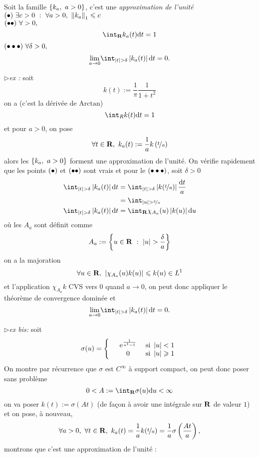 \documentclass[a4paper,11pt, twoside]{article}
\begin{document}


\begin{Def}
  Soit la famille $\ens{k_a,\ a>0}$, c'est une \emph{approximation de l'unité} \ssi\\
  $\Bullet\ \exists c>0\ :\ \forall a>0,\ \norm{k_a}_1\leqslant c$\\
  $(\bullet\bullet)\ \forall >0,$ 
  $$\dstyle\int_\R k_a(t)\dt=1$$
  $(\bullet\bullet\bullet)\ \forall \delta>0,$
  $$\underset{a\to 0}{\mathrm{lim}}\int_{\abs t>\delta}\abs{k_a(t)}\dt=0.$$
\end{Def}


$\triangleright$\emph{ex : }soit 
$$k(t):=\frac{1}{\pi}\frac{1}{1+t^2}$$
on a (c'est la dérivée de $\mathrm{Arctan}$) 
$$\int_R k(t)\dt=1$$
et pour $a>0$, on pose 
$$\forall t\in\R,\ k_a(t):=\frac{1}{a}k\Par{\nicefrac{t}{a}}$$
alors les $\ens{k_a,\ a>0}$ forment une approximation de l'unité. On vérifie rapidement que les points $(\bullet)$ et $(\bullet\bullet)$ sont vrais et pour le $(\bullet\bullet\bullet)$, soit $\delta>0$
\begin{align*}
  \int_{\abs t>\delta}\abs{k_a(t)}\dt&=\int_{\abs t>\delta}\abs{k(\nicefrac{t}{a})}\frac{\dt}{a}\\
  &=\int_{\abs u>\nicefrac{\delta}{a}}\\
  \int_{\abs t>\delta}\abs{k_a(t)}\dt&=\int_\R\chi_{A_a}(u)\abs{k(u)}\mathrm du\\
\end{align*}
où les $A_a$ sont définit comme 
$$A_a:=\ens{u\in\R\ :\ \abs u>\frac{\delta}{a}}$$
on a la majoration 
$$\forall u\in\mathbf R,\ \left| \chi_{A_a}(u)k(u)\right|\leqslant k(u)\in L^1$$
et l'application $\chi_{A_a}k$ CVS vers $0$ quand $a\to 0$, on peut donc appliquer le théorème de convergence dominée et 
$$\underset{a\to 0}{\mathrm{lim}}\int_{\abs t>\delta}\abs{k_a(t)}\dt=0.$$


$\triangleright$\emph{ex bis: }soit
$$\sigma(u)=\left\{
\begin{array}{lcc}
  &\mathrm{e}^{\frac{1}{u^1-1}}&\text{ si }\left| u\right|<1\\
  &0&\text{ si }\left| u\right|\geqslant 1
\end{array}\right.$$
On montre par récurrence que $\sigma$ est $C^\infty$ à support compact, on peut donc poser sans problème
$$0<A:=\int_\R\sigma(u)\mathrm du<\infty$$
on va poser $k(t):=\sigma(At)$ (de façon à avoir une intégrale sur $\mathbf R$ de valeur $1$) et on pose, à nouveau, 
$$\forall a>0,\ \forall t\in\R,\ k_a(t)=\frac{1}{a}k(\nicefrac{t}{a})=\frac{1}{a}\sigma\Par{\frac{At}{a}},$$
montrons que c'est une approximation de l'unité :
\end{document}
